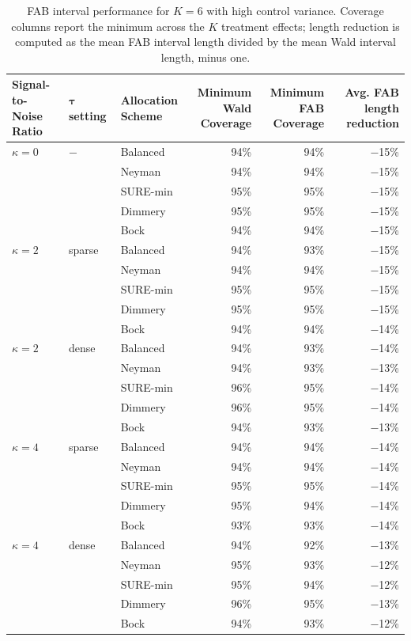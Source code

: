 \documentclass{article}
\newcommand{\bstau}{\boldsymbol \tau}
\begin{document}
\begin{table}[ht]
\centering
\begin{tabular}{lllrrr}
\toprule
\makecell[l]{Signal-to-\\Noise Ratio} & $\bstau$ setting & \makecell[l]{Allocation \\Scheme} & \makecell[l]{Minimum \\ Wald Coverage} & \makecell[l]{Minimum \\ FAB Coverage} & \makecell[l]{Avg. FAB\\length reduction} \\
\midrule
$\kappa=0$ & $-$ & Balanced & 94\% & 94\% & $-$15\% \\
 & & Neyman & 94\% & 94\% & $-$15\% \\
 & & SURE-min & 95\% & 95\% & $-$15\% \\
 & & Dimmery & 95\% & 95\% & $-$15\% \\
 & & Bock & 94\% & 94\% & $-$15\% \\
\addlinespace
$\kappa=2$ & sparse & Balanced & 94\% & 93\% & $-$15\% \\
 & & Neyman & 94\% & 94\% & $-$15\% \\
 & & SURE-min & 95\% & 95\% & $-$15\% \\
 & & Dimmery & 95\% & 95\% & $-$15\% \\
 & & Bock & 94\% & 94\% & $-$14\% \\
\addlinespace
$\kappa=2$ & dense & Balanced & 94\% & 93\% & $-$14\% \\
 & & Neyman & 94\% & 93\% & $-$13\% \\
 & & SURE-min & 96\% & 95\% & $-$14\% \\
 & & Dimmery & 96\% & 95\% & $-$14\% \\
 & & Bock & 94\% & 93\% & $-$13\% \\
\addlinespace
$\kappa=4$ & sparse & Balanced & 94\% & 94\% & $-$14\% \\
 & & Neyman & 94\% & 94\% & $-$14\% \\
 & & SURE-min & 95\% & 95\% & $-$14\% \\
 & & Dimmery & 95\% & 94\% & $-$14\% \\
 & & Bock & 93\% & 93\% & $-$14\% \\
\addlinespace
$\kappa=4$ & dense & Balanced & 94\% & 92\% & $-$13\% \\
 & & Neyman & 95\% & 93\% & $-$12\% \\
 & & SURE-min & 95\% & 94\% & $-$12\% \\
 & & Dimmery & 96\% & 95\% & $-$13\% \\
 & & Bock & 94\% & 93\% & $-$12\% \\
\bottomrule
\end{tabular}
\caption{FAB interval performance for $K=6$ with high control variance. Coverage columns report the minimum across the $K$ treatment effects; length reduction is computed as the mean FAB interval length divided by the mean Wald interval length, minus one.}
\label{tab:k6-fab-high-hetero-high-v}
\end{table}
\end{document}
